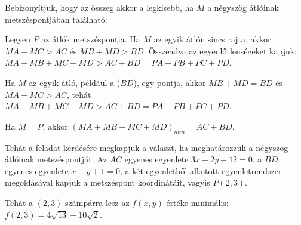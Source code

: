 \documentclass[a4paper,10pt]{article}
\begin{document}
Bebizonyítjuk, hogy az összeg akkor a legkisebb,
ha $M$ a négyszög átlóinak metszéspontjában található:

Legyen $P$ az átlók metszéspontja. Ha $M$ az egyik átlón sincs rajta,
akkor $MA+MC > AC$ és $MB+MD > BD$.
Összeadva az egyenlőtlenségeket kapjuk:
$MA+MB+MC+MD > AC+BD=PA+PB+PC+PD$.

Ha $M$ az egyik átló, például a ($BD$), egy pontja, akkor
$MB+MD=BD$ és $MA+MC > AC$, tehát
$MA+MB+MC+MD > AC+BD=PA+PB+PC+PD$.

Ha $M=P$, akkor $(MA+MB+MC+MD)_{min}= AC+BD$.

\smallskip
Tehát a feladat kérdésére megkapjuk a választ, ha meghatározzuk a
négyszög átlóinak metszéspontját. Az $AC$ egyenes egyenlete
$3x + 2y - 12 = 0$, a $BD$ egyenes egyenlete $x - y + 1 = 0$, a két egyenletből
alkotott egyenletrendszer megoldásával kapjuk a metszéspont
koordinátáit, vagyis $P(2, 3)$.

Tehát a $(2, 3)$ számpárra lesz az $f(x, y)$ értéke minimális:$f(2, 3)= 4\sqrt{13} + 10\sqrt{2}$.


\medskip
\end{document}
